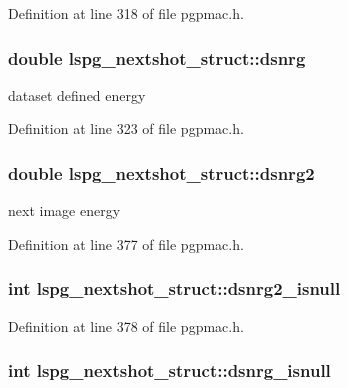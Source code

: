 Definition at line 318 of file pgpmac.\-h.

\hypertarget{structlspg__nextshot__struct_a371e574055fec7660b8f2e637eaf9f25}{
\subsubsection[{dsnrg}]{\setlength{\rightskip}{0pt plus 5cm}double lspg\-\_\-nextshot\-\_\-struct\-::dsnrg}}\label{structlspg__nextshot__struct_a371e574055fec7660b8f2e637eaf9f25}


dataset defined energy 



Definition at line 323 of file pgpmac.\-h.

\hypertarget{structlspg__nextshot__struct_ae461439c2af31255227765c0fb61850f}{
\subsubsection[{dsnrg2}]{\setlength{\rightskip}{0pt plus 5cm}double lspg\-\_\-nextshot\-\_\-struct\-::dsnrg2}}\label{structlspg__nextshot__struct_ae461439c2af31255227765c0fb61850f}


next image energy 



Definition at line 377 of file pgpmac.\-h.

\hypertarget{structlspg__nextshot__struct_aee9f8196dd9bcea832a60f2f0ea3a999}{
\subsubsection[{dsnrg2\-\_\-isnull}]{\setlength{\rightskip}{0pt plus 5cm}int lspg\-\_\-nextshot\-\_\-struct\-::dsnrg2\-\_\-isnull}}\label{structlspg__nextshot__struct_aee9f8196dd9bcea832a60f2f0ea3a999}


Definition at line 378 of file pgpmac.\-h.

\hypertarget{structlspg__nextshot__struct_ad14d8bb50290ec12e58f4aaec5cc5aab}{
\subsubsection[{dsnrg\-\_\-isnull}]{\setlength{\rightskip}{0pt plus 5cm}int lspg\-\_\-nextshot\-\_\-struct\-::dsnrg\-\_\-isnull}}\label{structlspg__nextshot__struct_ad14d8bb50290ec12e58f4aaec5cc5aab}


